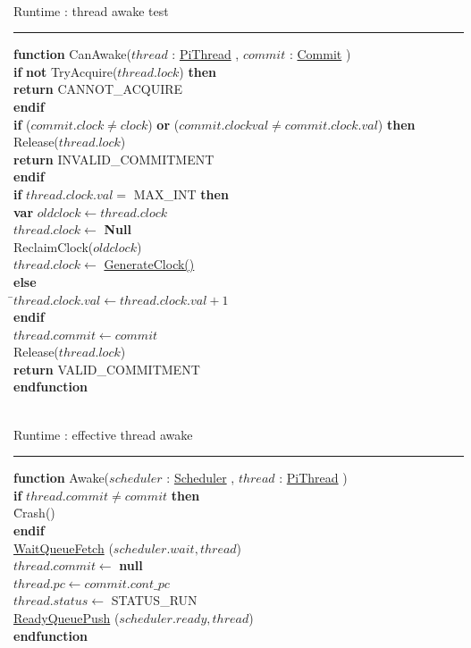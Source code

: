 \documentclass[a4paper,11pt]{article}
\newenvironment{program}{
  \begin{sffamily}
  \begin{scriptsize}
  \begin{tabbing}}
 {\end{tabbing}
  \end{scriptsize}
  \end{sffamily}}
\newcommand{\kw}[1]{\textsf{\textbf{#1}}}
\newcommand{\pindent}{\hspace{2em}\=}
\newcommand{\synchro}[1]{\textcolor{synchrocolor}{#1}}
\newcommand{\algotitle}[1]{\noindent\\ \noindent#1\par\nobreak\vspace{3pt}\hrule\vspace{6pt}}
\newcommand{\algosection}[1]{
  \phantomsection
  \algotitle{#1}
}
\newcommand{\myref}[1]{
  \hyperref[#1]{#1}
}
\begin{document}
\label{CanAwake}
\algosection{Runtime : thread awake test}
\begin{program}
  \kw{function} CanAwake($thread$ : \myref{PiThread}, $commit$ : \myref{Commit}) \\
  \pindent\kw{if} \synchro{\kw{not} TryAcquire($thread.lock$)} \kw{then} \\
  \>\pindent\kw{return} CANNOT\_ACQUIRE \\
  \>\kw{endif} \\
  \>\kw{if} ($commit.clock \neq clock$) \kw{or} ($commit.clockval \neq commit.clock.val$) \kw{then} \\
  \>\pindent\synchro{Release($thread.lock$)} \\
  \>\>\kw{return} INVALID\_COMMITMENT \\
  \>\kw{endif} \\
  \>\kw{if} $thread.clock.val =$ MAX\_INT \kw{then} \\
  \>\pindent\kw{var} $oldclock \leftarrow thread.clock$ \\
  \>\>$thread.clock \leftarrow$ \kw{Null} \\
  \>\>ReclaimClock($oldclock$) \\
  \>\>$thread.clock \leftarrow$ \myref{GenerateClock()} \\
  \>\kw{else} \\
  \>\pindent$thread.clock.val \leftarrow thread.clock.val + 1$ \\
  \>\kw{endif} \\
  \>$thread.commit \leftarrow commit$ \\
  \>\synchro{Release($thread.lock$)} \\
  \>\kw{return} VALID\_COMMITMENT \\
  \kw{endfunction}
\end{program}

\label{Awake}
\algosection{Runtime : effective thread awake}
\begin{program}
  \kw{function} Awake($scheduler$ : \myref{Scheduler}, $thread$ : \myref{PiThread}) \\
  \pindent\kw{if} $thread.commit \neq commit$ \kw{then} \\
  \>\pindent Crash() \\
  \>\kw{endif} \\
  \>\synchro{\myref{WaitQueueFetch}($scheduler.wait, thread$)} \\
  \>$thread.commit \leftarrow$ \kw{null} \\
  \>$thread.pc \leftarrow commit.cont\_pc$ \\
  \>$thread.status \leftarrow$ STATUS\_RUN \\
  \>\synchro{\myref{ReadyQueuePush}($scheduler.ready, thread$)} \\
  \kw{endfunction}
\end{program}
\end{document}
